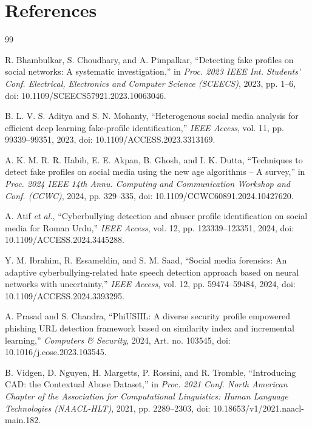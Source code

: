 \pagestyle{fancy}
\fancyhf{}
\renewcommand{\headrulewidth}{0pt}
\cfoot{\thepage}
\chapter{References}
\onehalfspacing
\begin{thebibliography}{99}

 R. Bhambulkar, S. Choudhary, and A. Pimpalkar, ``Detecting fake profiles on social networks: A systematic investigation,'' in \textit{Proc. 2023 IEEE Int. Students' Conf. Electrical, Electronics and Computer Science (SCEECS)}, 2023, pp. 1--6, doi: 10.1109/SCEECS57921.2023.10063046.

 B. L. V. S. Aditya and S. N. Mohanty, ``Heterogenous social media analysis for efficient deep learning fake-profile identification,'' \textit{IEEE Access}, vol. 11, pp. 99339--99351, 2023, doi: 10.1109/ACCESS.2023.3313169.

 A. K. M. R. R. Habib, E. E. Akpan, B. Ghosh, and I. K. Dutta, ``Techniques to detect fake profiles on social media using the new age algorithms -- A survey,'' in \textit{Proc. 2024 IEEE 14th Annu. Computing and Communication Workshop and Conf. (CCWC)}, 2024, pp. 329--335, doi: 10.1109/CCWC60891.2024.10427620.

 A. Atif \textit{et al.}, ``Cyberbullying detection and abuser profile identification on social media for Roman Urdu,'' \textit{IEEE Access}, vol. 12, pp. 123339--123351, 2024, doi: 10.1109/ACCESS.2024.3445288.

 Y. M. Ibrahim, R. Essameldin, and S. M. Saad, ``Social media forensics: An adaptive cyberbullying-related hate speech detection approach based on neural networks with uncertainty,'' \textit{IEEE Access}, vol. 12, pp. 59474--59484, 2024, doi: 10.1109/ACCESS.2024.3393295.

 A. Prasad and S. Chandra, ``PhiUSIIL: A diverse security profile empowered phishing URL detection framework based on similarity index and incremental learning,'' \textit{Computers \& Security}, 2024, Art. no. 103545, doi: 10.1016/j.cose.2023.103545.

 B. Vidgen, D. Nguyen, H. Margetts, P. Rossini, and R. Tromble, ``Introducing CAD: the Contextual Abuse Dataset,'' in \textit{Proc. 2021 Conf. North American Chapter of the Association for Computational Linguistics: Human Language Technologies (NAACL-HLT)}, 2021, pp. 2289--2303, doi: 10.18653/v1/2021.naacl-main.182.


\end{thebibliography}
